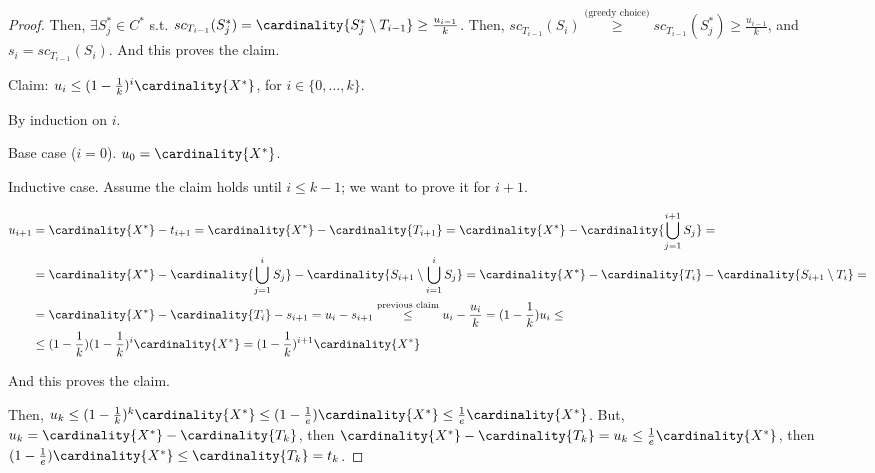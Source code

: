 \begin{proof}
        Then, $\exists S_j^* \in C^*$ s.t. $sc_{T_{i-1}}(S_j^*) = \cardinality{S_j^* \setminus T_{i-1}} \geq \frac{u_{i-1}}{k}$.
        Then, $sc_{T_{i-1}}(S_i) \overset{\text{(greedy choice)}}{\geq} sc_{T_{i-1}}(S_j^*) \geq \frac{u_{i-1}}{k}$, and $s_i = sc_{T_{i-1}}(S_i)$. And this proves the claim.

        Claim: $u_i \leq (1 - \frac{1}{k})^i \cardinality{X^*}$, for $i \in \{ 0, \dots, k \}$.

        By induction on $i$.

        Base case ($i=0$). $u_0 = \cardinality{X^*}$.

        Inductive case. Assume the claim holds until $i \leq k-1$; we want to prove it for $i+1$.

        
        \begin{equation*}
            \begin{split}
                u_{i+1} &= \cardinality{X^*} - t_{i+1} = \cardinality{X^*} - \cardinality{T_{i+1}} = \cardinality{X^*} - \cardinality{\bigcup_{j=1}^{i+1} S_j} =\\
                        &= \cardinality{X^*} - \cardinality{\bigcup_{j=1}^{i} S_j} - \cardinality{S_{i+1} \setminus \bigcup_{i=1}^i S_j} = \cardinality{X^*} - \cardinality{T_i} - \cardinality{S_{i+1} \setminus T_i} =\\
                        &= \cardinality{X^*} - \cardinality{T_i} - s_{i+1} = u_i - s_{i+1} \overset{\text{previous claim}}{\leq} u_i - \frac{u_i}{k} = (1 - \frac{1}{k})u_i \leq\\
                        &\leq (1 - \frac{1}{k}) (1 - \frac{1}{k})^i \cardinality{X^*} = (1 - \frac{1}{k})^{i+1} \cardinality{X^*}
            \end{split}
        \end{equation*}

        And this proves the claim.

        Then, $u_k \leq (1 - \frac{1}{k})^k \cardinality{X^*} \leq (1 - \frac{1}{e}) \cardinality{X^*} \leq \frac{1}{e} \cardinality{X^*}$.
        But, $u_k = \cardinality{X^*} - \cardinality{T_k}$, then $\cardinality{X^*} - \cardinality{T_k} = u_k \leq \frac{1}{e} \cardinality{X^*}$, then $(1 - \frac{1}{e}) \cardinality{X^*} \leq \cardinality{T_k} = t_k$.
        
    \end{proof}